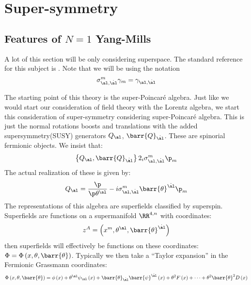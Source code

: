 \documentclass{booc}
\begin{document}
\section{Super-symmetry}

\subsection{Features of $N = 1$ Yang-Mills}

A lot of this section will be only considering superspace. 
The standard reference for this subject is 
\cite{wess_bagger}.
Note that we will be using the notation
\begin{equation}
\sigma^m_{\al , \dot{\al}} \gamma_m = \gamma_{\al , \dot{\al}}
\end{equation}

The starting point of this theory is the super-Poincar\'e algebra.
Just like we would start our consideration of field theory with the Lorentz algebra,
we start this consideration of super-symmetry considering super-Poincar\'e algebra.
This is just the normal rotations boosts and translations
with the added supersymmetry(SUSY) generators $Q_\al$, $\barr{Q}_{\dot{\al}}$.
These are spinorial fermionic objects. We insist that:
\begin{equation}
\left\{ Q_\al  , \barr{Q}_{\dot{\al}} \right\}
2_i\sigma_{\al , \dot{\al}}^m \p_m
\end{equation}
The actual realization of these is given by:
\begin{equation}
Q_\al = \frac{\p}{\p \theta^\al} - i \sigma^m_{\al , \dot{\al}} \barr{\theta}^{\dot{\al}} \p_m
\end{equation}
The representations of this algebra are superfields classified by superspin.
Superfields are functions on a supermanifold $\RR^{4, n}$ with coordinates:
\begin{align}
z^A = \left( x^m , \theta^\al , \barr{\theta}^{\dot{\al}} \right)
\end{align}
then superfields will effectively be functions on these coordinates:
$\Phi = \Phi\left( x, \theta, \barr{\theta} \right)$.
Typically we then take a ``Taylor expansion'' in the Fermionic Grassmann coordinates:
\begin{equation}
\Phi\left( x , \theta , \barr{\theta} \right) = 
\phi\left( x \right) + \theta^\al \psi_\al\left( x \right)+ 
\barr{\theta}_{\dot{\al}} \barr{\psi}^{\dot{\al}}\left( x \right) + 
\theta^2 F\left( x \right) + \cdots + \theta^2 \barr{\theta}^2 D\left( x \right)
\end{equation}
\end{document}
